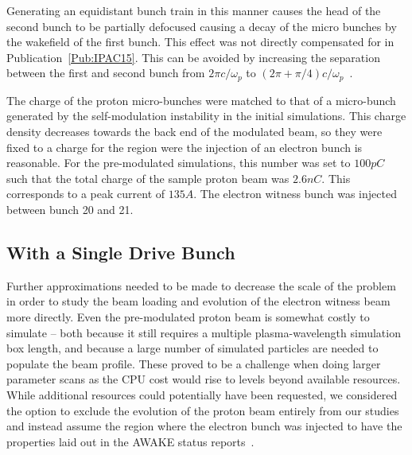 Generating an equidistant bunch train in this manner causes the head of the second bunch to be partially defocused causing a decay of the micro bunches by the wakefield of the first bunch.
This effect was not directly compensated for in Publication~\ref{Pub:IPAC15}.
This can be avoided by increasing the separation between the first and second bunch from $2\pi c/\omega_p$ to $(2\pi+\pi/4) c/\omega_p$~\cite{lotov:2018}.

The charge of the proton micro-bunches were matched to that of a micro-bunch generated by the self-modulation instability in the initial simulations.
This charge density decreases towards the back end of the modulated beam, so they were fixed to a charge for the region were the injection of an electron bunch is reasonable.
For the pre-modulated simulations, this number was set to $100\unit{pC}$ such that the total charge of the sample proton beam was $2.6\unit{nC}$.
This corresponds to a peak current of $135\unit{A}$.
The electron witness bunch was injected between bunch 20 and 21.



\subsection{With a Single Drive Bunch}
\label{Sim:PBSingle}

Further approximations needed to be made to decrease the scale of the problem in order to study the beam loading and evolution of the electron witness beam more directly.
Even the pre-modulated proton beam is somewhat costly to simulate -- both because it still requires a multiple plasma-wavelength simulation box length, and because a large number of simulated particles are needed to populate the beam profile.
These proved to be a challenge when doing larger parameter scans as the CPU cost would rise to levels beyond available resources.
While additional resources could potentially have been requested, we considered the option to exclude the evolution of the proton beam entirely from our studies and instead assume the region where the electron bunch was injected to have the properties laid out in the AWAKE status reports~\cite{awake_collaboration:2016}.

